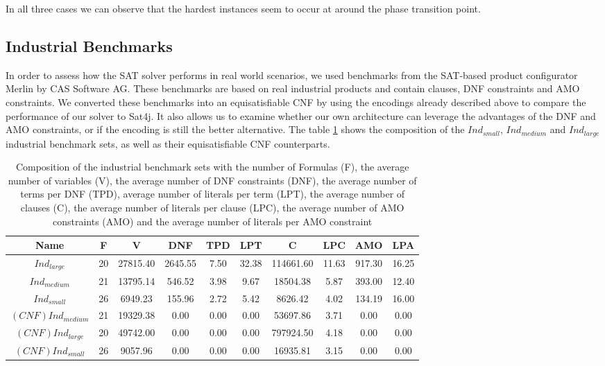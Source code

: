 \documentclass{easychair}
\begin{document}
In all three cases we can observe that the hardest instances seem to occur at around the phase transition point.


\subsection{Industrial Benchmarks}

In order to assess how the SAT solver performs in real world scenarios, 
we used benchmarks from the SAT-based product configurator Merlin by CAS Software AG. These benchmarks are based on real industrial products and contain clauses, DNF constraints and AMO constraints. We converted these benchmarks into an equisatisfiable CNF by using the encodings already described above to compare the performance of our solver to  Sat4j. It also allows us to examine whether our own architecture can leverage the advantages of the DNF and AMO constraints, or if the encoding is still the better alternative. The table \ref{tab:industrialBenchmarks} shows the composition of the $Ind_{small}$, $Ind_{medium}$ and $Ind_{large}$ industrial benchmark sets, as well as their equisatisfiable CNF counterparts.

\begin{table}
\centering
\caption{Composition of the industrial benchmark sets with the number of Formulas (F), the average number of variables (V), the average number of DNF constraints (DNF), the average number of terms per DNF (TPD), average number of literals per term (LPT), the average number of clauses (C), the average number of literals per clause (LPC), the average number of AMO constraints (AMO) and the average number of literals per AMO constraint}
\label{tab:industrialBenchmarks}
\begin{tabular}{|c|c|c|c|c|c|c|c|c|c|}
\hline
Name & F & V & DNF & TPD & LPT & C & LPC & AMO & LPA \\ 
\hline
$Ind_{large}$ & 20 & 27815.40 & 2645.55 & 7.50 & 32.38 & 114661.60 & 11.63 & 917.30 & 16.25 \\ 
 \hline 
$Ind_{medium}$ & 21 & 13795.14 & 546.52 & 3.98 & 9.67 & 18504.38 & 5.87 & 393.00 & 12.40 \\ 
 \hline 
$Ind_{small}$ & 26 & 6949.23 & 155.96 & 2.72 & 5.42 & 8626.42 & 4.02 & 134.19 & 16.00 \\ 
 \hline 
$(CNF)Ind_{medium}$& 21 & 19329.38 & 0.00 & 0.00 & 0.00 & 53697.86 & 3.71 & 0.00 & 0.00 \\ 
 \hline 
$(CNF)Ind_{large}$ & 20 & 49742.00 & 0.00 & 0.00 & 0.00 & 797924.50 & 4.18 & 0.00 & 0.00 \\ 
 \hline 
$(CNF)Ind_{small}$ & 26 & 9057.96 & 0.00 & 0.00 & 0.00 & 16935.81 & 3.15 & 0.00 & 0.00 \\ 
 \hline 
\end{tabular}
\end{table}
\end{document}
